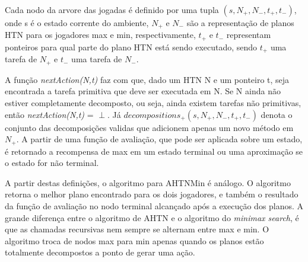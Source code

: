 Cada nodo da arvore das jogadas é definido por uma tupla $(s, N_{+}, N_{-}, t_{+}, t_{-})$, onde s é o estado corrente do ambiente, $N_{+}$ e $N_{-}$ são a representação de planos HTN para os jogadores max e min, respectivamente, $t_{+}$ e $t_{-}$ representam ponteiros para qual parte do plano HTN está sendo executado, sendo  $t_{+}$ uma tarefa de $N_{+}$ e $t_{-}$ uma tarefa de $N_{-}$. 

A função \textit{nextAction(N,t)} faz com que, dado um HTN N e um ponteiro t, seja encontrada a tarefa primitiva que deve ser executada em N. Se N ainda não estiver completamente decomposto, ou seja, ainda existem tarefas não primitivas, então \textit{nextAction(N,t)} = $\perp$. Já $decompositions_{+}(s, N_{+}, N_{-}, t_{+}, t_{-})$ denota o conjunto das decomposições validas que adicionem apenas um novo método em $N_{+}$. A partir de uma função de avaliação, que pode ser aplicada sobre um estado, é retornado a recompensa de max em um estado terminal ou uma aproximação se o estado for não terminal.

A partir destas definições, o algoritmo para AHTNMin é análogo. O algoritmo retorna o melhor plano encontrado para os dois jogadores, e também o resultado da função de avaliação no nodo terminal alcançado após a execução dos planos. A grande diferença entre o algoritmo de AHTN e o algoritmo do \textit{minimax search}, é que as chamadas recursivas nem sempre se alternam entre max e min. O algoritmo troca de nodos max para min apenas quando os planos estão totalmente decompostos a ponto de gerar uma ação. 

